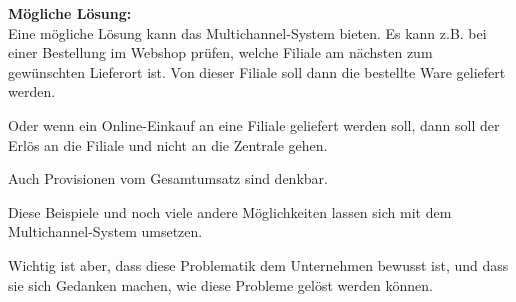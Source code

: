 \textbf{Mögliche Lösung:}\\
Eine mögliche Lösung kann das Multichannel-System bieten. Es kann z.B. bei einer Bestellung im Webshop prüfen, welche Filiale am nächsten zum gewünschten Lieferort ist. Von dieser Filiale soll dann die bestellte Ware geliefert werden.

Oder wenn ein Online-Einkauf an eine Filiale geliefert werden soll, dann soll der Erlös an die Filiale und nicht an die Zentrale gehen.

Auch Provisionen vom Gesamtumsatz sind denkbar.

Diese Beispiele und noch viele andere Möglichkeiten lassen sich mit dem Multichannel-System umsetzen.

Wichtig ist aber, dass diese Problematik dem Unternehmen bewusst ist, und dass sie sich Gedanken machen, wie diese Probleme gelöst werden können.